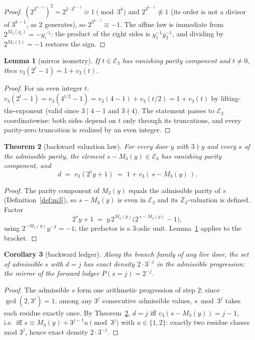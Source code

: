 \documentclass[11pt]{article}
\newtheorem{theorem}{Theorem}[section]
\newtheorem{lemma}[theorem]{Lemma}
\newtheorem{corollary}[theorem]{Corollary}
\theoremstyle{remark}
\newcommand{\Z}{\mathbb{Z}}
\newcommand{\vth}[1]{v_3\!\left(#1\right)}
\newcommand{\E}{\mathcal{E}_3}
\begin{document}
\begin{proof}
$(2^{3^{k-1}})^2 = 2^{2\cdot3^{k-1}} \equiv 1 \pmod{3^k}$ and $2^{3^{k-1}} \not\equiv 1$ (its order is not a divisor of $3^{k-1}$, as $2$ generates), so $2^{3^{k-1}} \equiv -1$. The affine law is immediate from $2^{M_3(y_i)} = -y_i^{-1}$: the product of the right sides is $y_1^{-1}y_2^{-1}$, and dividing by $2^{M_3(1)} = -1$ restores the sign.
\end{proof}

\begin{lemma}[mirror isometry]\label{lem:iso3}
If $t \in \E$ has vanishing parity component and $t \neq 0$, then $\vth{2^t - 1} = 1 + \vth{t}$.
\end{lemma}

\begin{proof}
For an even integer $t$: $\vth{2^t - 1} = \vth{4^{t/2} - 1} = \vth{4 - 1} + \vth{t/2} = 1 + \vth{t}$ by lifting-the-exponent (valid since $3 \mid 4 - 1$ and $3 \nmid 4$). The statement passes to $\E$ coordinatewise: both sides depend on $t$ only through its truncations, and every parity-zero truncation is realized by an even integer.
\end{proof}

\begin{theorem}[backward valuation law]\label{thm:blaw}
For every door $y$ with $3\nmid y$ and every $s$ of the admissible parity, the element $s - M_3(y) \in \E$ has vanishing parity component, and
\[ d \;=\; \vth{2^s y + 1} \;=\; 1 + \vth{\,s - M_3(y)\,}. \]
\end{theorem}

\begin{proof}
The parity component of $M_3(y)$ equals the admissible parity of $s$ (Definition~\ref{def:m3}), so $s - M_3(y)$ is even in $\E$ and its $\Z_3$-valuation is defined. Factor
\[ 2^s y + 1 \;=\; y\,2^{M_3(y)}\bigl(2^{\,s - M_3(y)} - 1\bigr), \]
using $2^{-M_3(y)}y^{-1} = -1$; the prefactor is a $3$-adic unit. Lemma~\ref{lem:iso3} applies to the bracket.
\end{proof}

\begin{corollary}[backward ledger]\label{cor:ledger}
Along the branch family of any live door, the set of admissible $s$ with $d = j$ has exact density $2\cdot3^{-j}$ in the admissible progression: the mirror of the forward ledger $P(s = j) = 2^{-j}$.
\end{corollary}

\begin{proof}
The admissible $s$ form one arithmetic progression of step $2$; since $\gcd(2, 3^j) = 1$, among any $3^j$ consecutive admissible values, $s \bmod 3^j$ takes each residue exactly once. By Theorem~\ref{thm:blaw}, $d = j$ iff $\vth{s - M_3(y)} = j - 1$, i.e.\ iff $s \equiv M_3(y) + 3^{j-1}u \pmod{3^j}$ with $u \in \{1, 2\}$: exactly two residue classes mod $3^j$, hence exact density $2\cdot3^{-j}$.
\end{proof}
\end{document}
